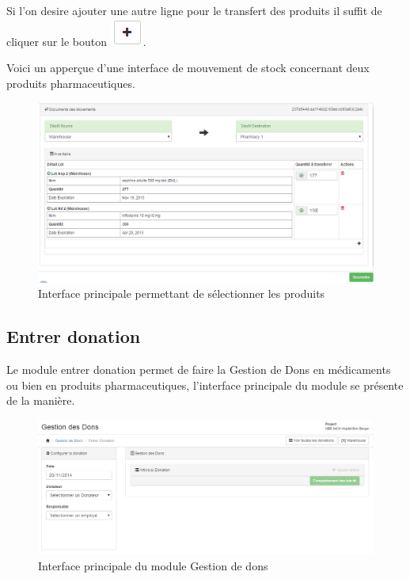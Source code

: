 \documentclass[12pt,a4paper]{report}
\begin{document}
Si l'on desire ajouter une autre ligne pour le transfert des produits il suffit de cliquer sur le bouton \includegraphics[scale=0.7]{pic/plusBlack.png}. 

Voici un apperçue d'une interface de mouvement de stock concernant deux produits pharmaceutiques.

\begin{figure}[h]
\begin{center}
\includegraphics[width=14cm]{pic/DocMovTransfert.png}
\end{center}
\caption{Interface principale permettant de sélectionner les produits}
\label{Interface principale permettant de sélectionner les produits}
\end{figure}

\newpage
\subsection{Entrer donation}
Le module entrer donation permet de faire la Gestion de Dons en médicaments ou bien en produits pharmaceutiques, l'interface principale du module se présente de la manière.

\begin{figure}[h]
\begin{center}
\includegraphics[width=14cm]{pic/GestionDon.png}
\end{center}
\caption{Interface principale du module Gestion de dons}
\label{Interface principale du module Gestion de dons}
\end{figure}
\end{document}
